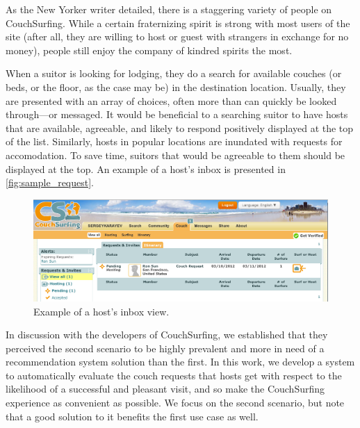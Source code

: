 As the New Yorker writer detailed, there is a staggering variety of people on CouchSurfing.
While a certain fraternizing spirit is strong with most users of the site (after all, they are willing to host or guest with strangers in exchange for no money), people still enjoy the company of kindred spirits the most.

When a suitor is looking for lodging, they do a search for available couches (or beds, or the floor, as the case may be) in the destination location.
Usually, they are presented with an array of choices, often more than can quickly be looked through---or messaged.
It would be beneficial to a searching suitor to have hosts that are available, agreeable, and likely to respond positively displayed at the top of the list.
Similarly, hosts in popular locations are inundated with requests for accomodation.
To save time, suitors that would be agreeable to them should be displayed at the top.
An example of a host's inbox is presented in \autoref{fig:sample_request}.

\begin{figure}[ht]
\centering
\includegraphics[width=1\linewidth]{figures/screenshots/requests.png}
\caption{Example of a host's inbox view.}
\end{figure}

In discussion with the developers of CouchSurfing, we established that they perceived the second scenario to be highly prevalent and more in need of a recommendation system solution than the first.
In this work, we develop a system to automatically evaluate the couch requests that hosts get with respect to the likelihood of a successful and pleasant visit, and so make the CouchSurfing experience as convenient as possible.
We focus on the second scenario, but note that a good solution to it benefits the first use case as well.